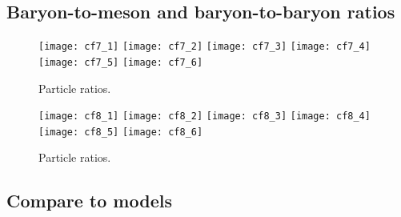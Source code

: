\subsection{Baryon-to-meson and baryon-to-baryon ratios}
\label{subsec:ParRatios}
\begin{figure}[!ht]
	\begin{center}
		\texttt{[image: cf7\_1]}
		\texttt{[image: cf7\_2]}
		\texttt{[image: cf7\_3]}
		\texttt{[image: cf7\_4]}
		\texttt{[image: cf7\_5]}
		\texttt{[image: cf7\_6]}
	\end{center}
	\caption{Particle ratios.}
	\label{fig:ppRatio}
\end{figure}
\begin{figure}[!ht]
	\begin{center}
		\texttt{[image: cf8\_1]}
		\texttt{[image: cf8\_2]}
		\texttt{[image: cf8\_3]}
		\texttt{[image: cf8\_4]}
		\texttt{[image: cf8\_5]}
		\texttt{[image: cf8\_6]}
	\end{center}
	\caption{Particle ratios.}
	\label{fig:pPbRatio}
\end{figure}

\subsection{Compare to models}
\label{subsec:ComToMod}
